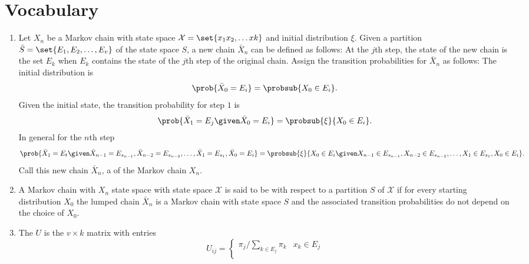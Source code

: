 \documentclass[12pt]{article}
\begin{document}
\hr

\section*{Vocabulary}
\begin{enumerate}
    \item
        Let \( X_n \) be a Markov chain with state space \( \mathcal{X}
        = \set{x_1 x_2, \dots x k} \) and initial distribution \( \xi \).
        Given a partition \( \bar{S} = \set{E_1, E_2, \dots, E_v} \) of
        the state space \( S \), a new chain \( \bar{X}_n \) can be
        defined as follows:  At the \( j \)th step, the state of the new
        chain is the set \( E_k \) when \( E_k \) contains the state of
        the \( j \)th step of the original chain.  Assign the transition
        probabilities for \( \bar{X}_n \) as follows: The initial
        distribution is
        \[
            \prob{\bar{X}_0 = E_i} = \probsub{X_0 \in E_i}.
        \] Given the initial state, the transition probability for step \(
        1 \) is
        \[
            \prob{\bar{X}_1 = E_j \given \bar{X}_0 = E_i} = \probsub{\xi}
            {X_0 \in E_i }.
        \] In general for the \( n \)th step
        \[
            \prob{\bar{X}_1 = E_t \given \bar{X}_{n-1} = E_{s_{n-1}},
            \bar{X}_{n-2} = E_{s_{n-2}}, \dots, \bar{X}_1 = E_{s_1},
            \bar{X}_0 = E_i} = \probsub{\xi}{X_0 \in E_i \given X_{n-1}
            \in E_{s_{n-1}}, X_{n-2} \in E_{s_{n-2}}, \dots, X_1 \in E_{s_1},
            X_0 \in E_i}.
        \] Call this new chain \( \bar{X}_n \), a %
        of the Markov chain \( X_n \).
    \item
        A Markov chain with \( X_n \) state space with state space \(
        \mathcal{X} \) is said to be %
        with respect to a partition \( S \) of \( \mathcal{X} \) if for
        every starting distribution \( X_0 \) the lumped chain \( \bar{X}_n
        \) is a Markov chain with state space \( S \) and the associated
        transition probabilities do not depend on the choice of \( X_0 \).
    \item
        The %
        \( U \) is the \( v \times k \) matrix with entries
        \[
            U_{ij} =
            \begin{cases}
                \pi_j/\sum_{k \in E_j} \pi_k & x_k \in E_j \\

\end{cases}\]
\end{enumerate}
\end{document}
